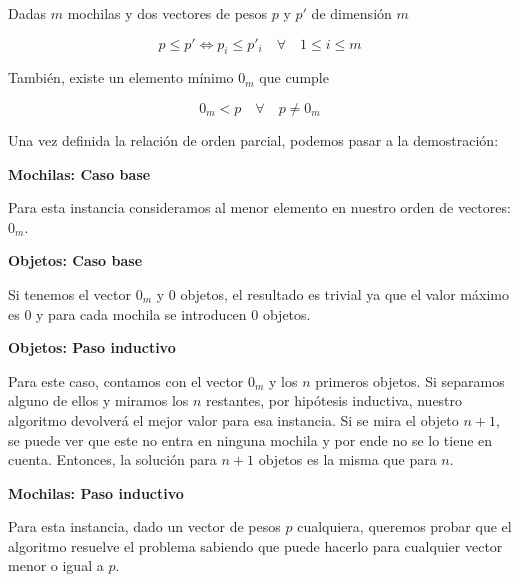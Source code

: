 Dadas $m$ mochilas y dos vectores de pesos $p$ y $p'$ de dimensión $m$

$$p \leq p' \Leftrightarrow p_i \leq p'_i \quad \forall \quad 1 \leq i \leq m$$

También, existe un elemento mínimo $0_m$ que cumple

$$0_m < p \quad \forall \quad p \neq 0_m$$

Una vez definida la relación de orden parcial, podemos pasar a la demostración:

\vspace{5mm}

{\Large\textbf{Mochilas: Caso base}}

\vspace{5mm}

Para esta instancia consideramos al menor elemento en nuestro orden de vectores: $0_m$.

\vspace{5mm}

{\large\textbf{Objetos: Caso base}}

\vspace{5mm}

Si tenemos el vector $0_m$ y $0$ objetos, el resultado es trivial ya que el valor máximo es $0$ y para cada mochila se introducen $0$ objetos.

\vspace{5mm}

{\large\textbf{Objetos: Paso inductivo}}

\vspace{5mm}

Para este caso, contamos con el vector $0_m$ y los $n$ primeros objetos. Si separamos alguno de ellos y miramos los $n$ restantes, por hipótesis inductiva, nuestro algoritmo devolverá el mejor valor para esa instancia. Si se mira el objeto $n + 1$, se puede ver que este no entra en ninguna mochila y por ende no se lo tiene en cuenta. Entonces, la solución para $n + 1$ objetos es la misma que para $n$.

\vspace{5mm}

{\Large\textbf{Mochilas: Paso inductivo}}

\vspace{5mm}

Para esta instancia, dado un vector de pesos $p$ cualquiera, queremos probar que el algoritmo resuelve el problema sabiendo que puede hacerlo para cualquier vector menor o igual a $p$.

\vspace{5mm}

